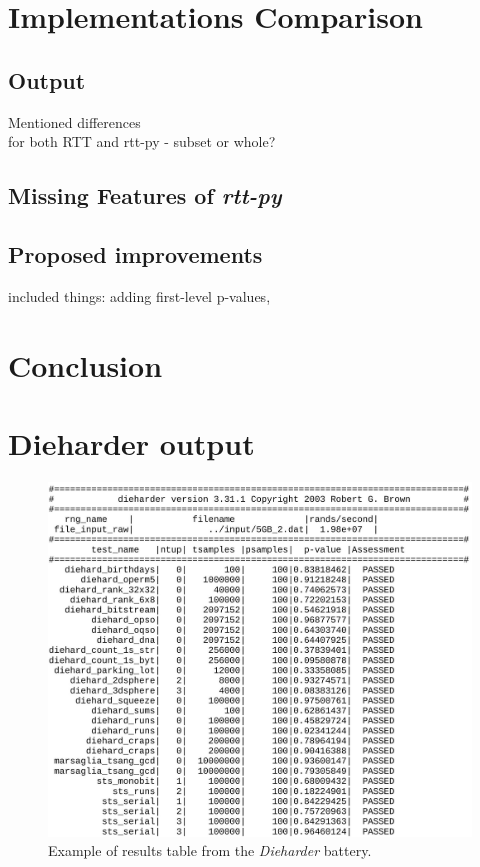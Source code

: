 \documentclass[
  digital,     %
  oneside,     %
  nosansbold,  %
  nocolorbold, %
  nolof,         %
  nolot,         %
]{fithesis4}
\begin{document}
\chapter{Implementations Comparison}

\section{Output}
Mentioned differences\\
for both RTT and rtt-py - subset or whole?

\section{Missing Features of \emph{rtt-py}}

\section{Proposed improvements}
included things: adding first-level p-values, 


\chapter{Conclusion}

\appendix 

\chapter{Dieharder output} \label{append:dieharder-output}

\begin{figure}
  \begin{center}
    \includegraphics[width=12cm]{figures/outputs-appendix/dieharder-1.jpg}
  \end{center}
  \caption{Example of results table from the \emph{Dieharder} battery.}
  \label{die_out}
\end{figure}
\end{document}
